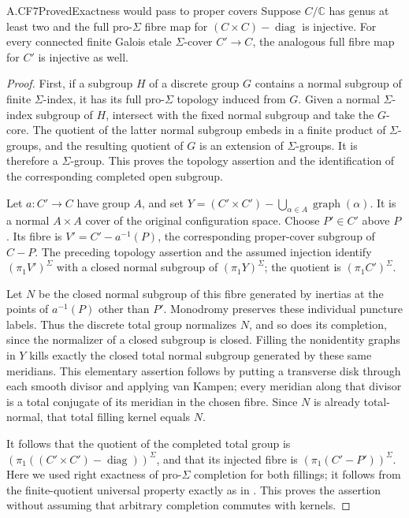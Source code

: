\begin{claim}{A.CF7}{Proved}{Exactness would pass to proper covers}
Suppose $C/\mathbb C$ has genus at least two and the full pro-$\Sigma$
fibre map for $(C\times C)-\operatorname{diag}$ is injective.
For every connected finite Galois etale $\Sigma$-cover $C'\to C$,
the analogous full fibre map for $C'$ is injective as well.
\end{claim}
\begin{proof}
First, if a subgroup $H$ of a discrete group $G$ contains a normal
subgroup of finite $\Sigma$-index, it has its full pro-$\Sigma$
topology induced from $G$. Given a normal $\Sigma$-index subgroup
of $H$, intersect with the fixed normal subgroup and take the
$G$-core. The quotient of the latter normal subgroup embeds in a
finite product of $\Sigma$-groups, and the resulting quotient of
$G$ is an extension of $\Sigma$-groups. It is therefore a
$\Sigma$-group. This proves the topology assertion and the
identification of the corresponding completed open subgroup.

Let $a:C'\to C$ have group $A$, and set
$Y=(C'\times C')-\bigcup_{\alpha\in A}\operatorname{graph}(\alpha)$.
It is a normal $A\times A$ cover of the original configuration
space. Choose $P'\in C'$ above $P$. Its fibre is
$V'=C'-a^{-1}(P)$, the corresponding proper-cover subgroup of
$C-P$. The preceding topology assertion and the assumed injection
identify $(\pi_1V')^\Sigma$ with a closed normal subgroup of
$(\pi_1Y)^\Sigma$; the quotient is $(\pi_1C')^\Sigma$.

Let $N$ be the closed normal subgroup of this fibre generated by
inertias at the points of $a^{-1}(P)$ other than $P'$. Monodromy
preserves these individual puncture labels. Thus the discrete total
group normalizes $N$, and so does its completion, since the
normalizer of a closed subgroup is closed. Filling the nonidentity
graphs in $Y$ kills exactly the closed total normal subgroup generated
by these same meridians. This elementary assertion follows by putting
a transverse disk through each smooth divisor and applying van
Kampen; every meridian along that divisor is a total conjugate of
its meridian in the chosen fibre. Since $N$ is already total-normal,
that total filling kernel equals $N$.

It follows that the quotient of the completed total group is
$(\pi_1((C'\times C')-\operatorname{diag}))^\Sigma$, and that its
injected fibre is $(\pi_1(C'-P'))^\Sigma$. Here we used right
exactness of pro-$\Sigma$ completion for both fillings; it follows
from the finite-quotient universal property exactly as in
. This proves the assertion without assuming
that arbitrary completion commutes with kernels.
\end{proof}

